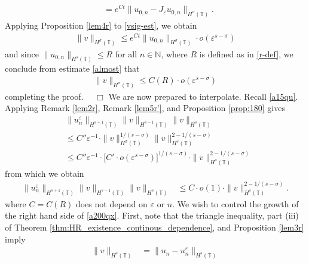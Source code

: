 \documentclass[12pt,reqno]{amsart}
\newcommand{\ci}{\mathbb{T}}
\newcommand{\ee}{\varepsilon}
\theoremstyle{plain}  %
\theoremstyle{definition}
\begin{document}
\begin{appendices}
\begin{equation}
\begin{split}
		& = e^{C t}\|u_{0,n} - J_\ee u_{0,n}\|_{H^{\sigma}(\ci)}.
	\end{split}
\end{equation}
Applying Proposition \ref{lem4r} to \eqref{vsig-est}, we obtain 
\begin{equation}
	\label{almost}
	\begin{split}
		\|v\|_{H^\sigma (\ci)} \le e^{Ct} \|u_{0,n}\|_{H^\sigma(\ci)} \cdot
		o(\ee^{s-\sigma})
	\end{split}
\end{equation}
and since $\|u_{0,n}\|_{H^s(\ci)} \le R$ for all $n \in \mathbb{N}$, where
$R$ is defined as in \eqref{r-def}, we conclude from estimate \eqref{almost} that
\begin{equation*}
	\begin{split}
		\|v\|_{H^\sigma(\ci)} \le C(R) \cdot o(\ee^{s-\sigma})
	\end{split}
\end{equation*}
completing the proof. $\quad \Box$
\vskip0.1in
We are now prepared to interpolate. Recall \eqref{a15qu}. Applying Remark
\ref{lem2r}, Remark \ref{lem5r'}, and
Proposition \ref{prop:180} gives
\begin{equation*}
	\begin{split}
		& \|u^\ee_n \|_{H^{s+1}(\ci)} \|v\|_{H^{s-1}(\ci)} \|v\|_{H^s
		(\ci)}
		\\
		&\le C'' \ee^{-1} \cdot \|v\|_{H^\sigma(\ci)}^{1/(s-\sigma)}
		\|v\|_{H^s(\ci)}^{2 - 1/(s- \sigma)}
		\\
		& \le C'' \ee^{-1} \cdot \Big [C' \cdot o(\ee^{s- \sigma})\Big ]^{1/(s-\sigma)}
		\cdot \|v\|_{H^s(\ci)}^{2- 1/(s-\sigma)}
	\end{split}
\end{equation*}
from which we obtain
\begin{equation}
	\begin{split}
		\label{a200qx}
		\|u^\ee_n\|_{H^{s+1}(\ci)} \|v\|_{H^{s-1}(\ci)} \|v \|_{H^s(\ci)}
		& \le  C \cdot o(1) \cdot \|v\|_{H^s(\ci)}^{2- 1/(s-\sigma)}.
	\end{split}
\end{equation}
where $C=C(R)$ does not depend on $\ee$ or $n$. We wish to control the growth of the right hand side of \eqref{a200qx}.
First, note that the triangle inequality, part (iii) of Theorem
\ref{thm:HR_existence_continous_dependence}, and Proposition \ref{lem3r} imply
\begin{equation}
	\begin{split}
		\|v\|_{H^s(\ci)} & = \|u_n - u^\ee_n \|_{H^s(\ci)} 

\end{split}
\end{equation}
\end{appendices}
\end{document}
